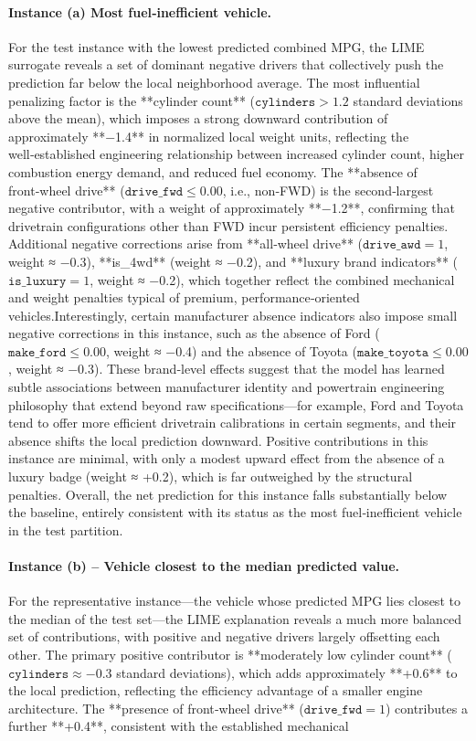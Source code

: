 \paragraph{Instance (a) Most fuel‑inefficient vehicle.}
For the test instance with the lowest predicted combined MPG, the LIME surrogate reveals a set of dominant negative drivers that collectively push the prediction far below the local neighborhood average. The most influential penalizing factor is the **cylinder count** (\(\texttt{cylinders} > 1.2\) standard deviations above the mean), which imposes a strong downward contribution of approximately **−1.4** in normalized local weight units, reflecting the well‑established engineering relationship between increased cylinder count, higher combustion energy demand, and reduced fuel economy. The **absence of front‑wheel drive** (\(\texttt{drive\_fwd} \leq 0.00\), i.e., non‑FWD) is the second‑largest negative contributor, with a weight of approximately **−1.2**, confirming that drivetrain configurations other than FWD incur persistent efficiency penalties. Additional negative corrections arise from **all‑wheel drive** (\(\texttt{drive\_awd} = 1\), weight ≈ −0.3), **is\_4wd** (weight ≈ −0.2), and **luxury brand indicators** (\(\texttt{is\_luxury} = 1\), weight ≈ −0.2), which together reflect the combined mechanical and weight penalties typical of premium, performance‑oriented vehicles.Interestingly, certain manufacturer absence indicators also impose small negative corrections in this instance, such as the absence of Ford (\(\texttt{make\_ford} \leq 0.00\), weight ≈ −0.4) and the absence of Toyota (\(\texttt{make\_toyota} \leq 0.00\), weight ≈ −0.3). These brand‑level effects suggest that the model has learned subtle associations between manufacturer identity and powertrain engineering philosophy that extend beyond raw specifications—for example, Ford and Toyota tend to offer more efficient drivetrain calibrations in certain segments, and their absence shifts the local prediction downward. Positive contributions in this instance are minimal, with only a modest upward effect from the absence of a luxury badge (weight ≈ +0.2), which is far outweighed by the structural penalties. Overall, the net prediction for this instance falls substantially below the baseline, entirely consistent with its status as the most fuel‑inefficient vehicle in the test partition.\paragraph{Instance (b) – Vehicle closest to the median predicted value.} For the representative instance—the vehicle whose predicted MPG lies closest to the median of the test set—the LIME explanation reveals a much more balanced set of contributions, with positive and negative drivers largely offsetting each other. The primary positive contributor is **moderately low cylinder count** (\(\texttt{cylinders} \approx -0.3\) standard deviations), which adds approximately **+0.6** to the local prediction, reflecting the efficiency advantage of a smaller engine architecture. The **presence of front‑wheel drive** (\(\texttt{drive\_fwd} = 1\)) contributes a further **+0.4**, consistent with the established mechanical 